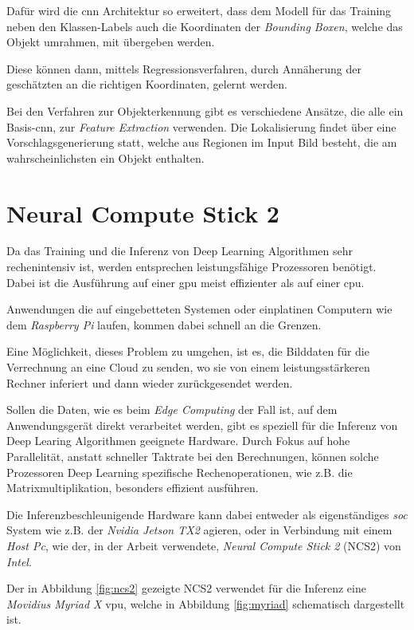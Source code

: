 Dafür wird die \Gls{cnn} Architektur so erweitert,
dass dem Modell für das Training neben den Klassen-Labels
auch die Koordinaten der \textit{Bounding Boxen},
welche das Objekt umrahmen, mit übergeben werden.

Diese können dann, mittels Regressionsverfahren, 
durch Annäherung der geschätzten an die richtigen 
Koordinaten, gelernt werden.

Bei den Verfahren zur Objekterkennung gibt es 
verschiedene Ansätze, die alle ein Basis-\Gls{cnn},
zur \textit{Feature Extraction} verwenden.
Die Lokalisierung findet über eine 
Vorschlagsgenerierung statt, welche aus 
Regionen im Input Bild besteht, die 
am wahrscheinlichsten ein Objekt enthalten.


\section{Neural Compute Stick 2}\label{ncs2}

Da das Training und die Inferenz von Deep Learning Algorithmen
sehr rechenintensiv ist, werden entsprechen leistungsfähige 
Prozessoren benötigt. Dabei ist die Ausführung auf einer
\Gls{gpu} meist effizienter als auf einer \Gls{cpu}.

Anwendungen die auf eingebetteten Systemen oder einplatinen 
Computern wie dem \textit{Raspberry Pi} laufen,
kommen dabei schnell an die Grenzen.

Eine Möglichkeit, dieses Problem zu umgehen,
ist es, die Bilddaten für die 
Verrechnung an eine Cloud zu senden, wo sie 
von einem leistungsstärkeren Rechner inferiert und 
dann wieder zurückgesendet werden.

Sollen die Daten, wie es beim \textit{Edge Computing} der Fall ist, 
auf dem Anwendungsgerät direkt verarbeitet werden,
gibt es speziell für die Inferenz von Deep Learing Algorithmen
geeignete Hardware.
Durch Fokus auf hohe Parallelität, anstatt schneller Taktrate
bei den Berechnungen, können solche Prozessoren
Deep Learning spezifische Rechenoperationen, 
wie z.B. die Matrixmultiplikation, besonders effizient 
ausführen.

Die Inferenzbeschleunigende Hardware kann dabei entweder
als eigenständiges \textit{\Gls{soc}}
System wie z.B. der \textit{Nvidia Jetson TX2} agieren, oder
in Verbindung mit einem \textit{Host Pc}, wie der, in der Arbeit 
verwendete, \textit{Neural Compute Stick 2} (NCS2) von \textit{Intel}.

Der in Abbildung \ref{fig:ncs2} gezeigte NCS2
verwendet für die Inferenz eine
\textit{Movidius Myriad X} \Gls{vpu},
welche in Abbildung \ref{fig:myriad} schematisch 
dargestellt ist.

